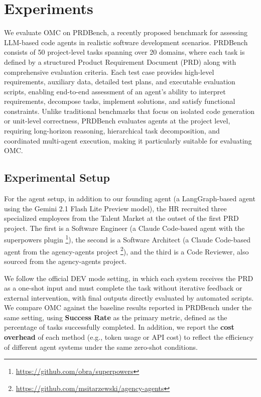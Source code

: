 \documentclass[11pt,a4paper]{article}
\begin{document}
\section{Experiments}
\label{sec:experiments}

We evaluate OMC on PRDBench, a recently proposed benchmark for assessing LLM-based code agents in realistic software development scenarios.  PRDBench consists of 50 project-level tasks spanning over 20 domains, where each task is defined by a structured Product Requirement Document (PRD) along with comprehensive evaluation criteria.  Each test case provides high-level requirements, auxiliary data, detailed test plans, and executable evaluation scripts, enabling end-to-end assessment of an agent’s ability to interpret requirements, decompose tasks, implement solutions, and satisfy functional constraints.  Unlike traditional benchmarks that focus on isolated code generation or unit-level correctness, PRDBench evaluates agents at the project level, requiring long-horizon reasoning, hierarchical task decomposition, and coordinated multi-agent execution, making it particularly suitable for evaluating OMC.

\subsection{Experimental Setup}

For the agent setup, in addition to our founding agent (a LangGraph-based agent using the Gemini 2.1 Flash Lite Preview model), the HR recruited three specialized employees from the Talent Market at the outset of the first PRD project. The first is a Software Engineer (a Claude Code-based agent with the superpowers plugin \footnote{\url{https://github.com/obra/superpowers}}), the second is a Software Architect (a Claude Code-based agent from the agency-agents project \footnote{\url{https://github.com/msitarzewski/agency-agents}}), and the third is a Code Reviewer, also sourced from the agency-agents project.

We follow the official DEV mode setting, in which each system receives the PRD as a one-shot input and must complete the task without iterative feedback or external intervention, with final outputs directly evaluated by automated scripts. We compare OMC against the baseline results reported in PRDBench under the same setting, using \textbf{Success Rate} as the primary metric, defined as the percentage of tasks successfully completed. In addition, we report the \textbf{cost overhead} of each method (e.g., token usage or API cost) to reflect the efficiency of different agent systems under the same zero-shot conditions.
\end{document}
